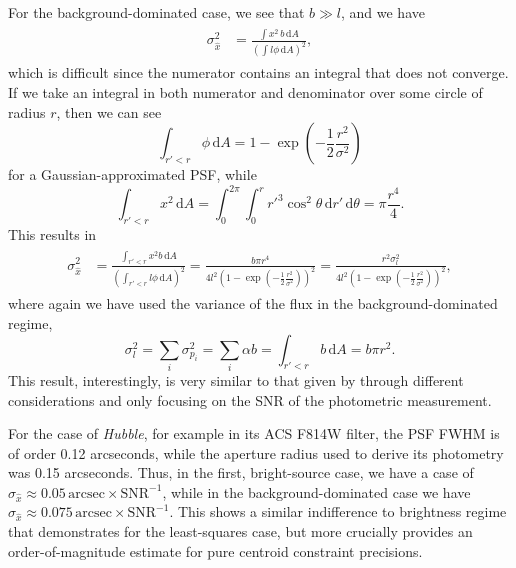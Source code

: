 \documentclass[SE,lsstdraft,authoryear,toc]{lsstdoc}
\begin{document}
For the background-dominated case, we see that $b \gg l$, and we have
\begin{align}
\begin{split}
  \sigma_{\hat{x}}^2 &= \frac{\int\!x^2\,b\,\mathrm{d}A}{\left(\int\!l\phi\,\mathrm{d}A\right)^2},
\end{split}
\end{align}
which is difficult since the numerator contains an integral that does not converge.
If we take an integral in both numerator and denominator over some circle of radius $r$, then we can see
\begin{equation}
  \int_{r{'} < r}\!\phi\,\mathrm{d}A = 1 - \exp\left(-\frac{1}{2} \frac{r^2}{\sigma^2}\right)
\end{equation}
for a Gaussian-approximated PSF, while
\begin{equation}
  \int_{r{'} < r}\! x^2\,\mathrm{d}A = \int_0^{2\pi}\!\int_0^{r} r{'}^3 \cos^2{\theta}\,\mathrm{d}r{'}\,\mathrm{d}\theta = \pi \frac{r^4}{4}.
\end{equation}
This results in
\begin{align}
\begin{split}
  \sigma_{\hat{x}}^2 &= \frac{\int_{r{'} < r}\! x^2b\,\mathrm{d}A}{\left(\int_{r{'} < r}\!l\phi\,\mathrm{d}A\right)^2} = \frac{b \pi r^4}{4 l^2 \left(1 - \exp\left(-\frac{1}{2} \frac{r^2}{\sigma^2}\right)\right)^2} = \frac{r^2 \sigma_l^2}{4l^2\left(1 - \exp\left(-\frac{1}{2} \frac{r^2}{\sigma^2}\right)\right)^2},
\end{split}
\end{align}
where again we have used the variance of the flux in the background-dominated regime,
\begin{equation}
  \sigma_l^2 = \sum_i \sigma_{p_i}^2 = \sum_i \alpha b= \int_{r{'} < r}\! b\,\mathrm{d}A = b \pi r^2.
\end{equation}
This result, interestingly, is very similar to that given by \citet{Naylor:1998aa} through different considerations and only focusing on the SNR of the photometric measurement.

For the case of \textit{Hubble}, for example in its ACS F814W filter, the PSF FWHM is of order 0.12 arcseconds, while the aperture radius used to derive its photometry was 0.15 arcseconds.
Thus, in the first, bright-source case, we have a case of $\sigma_{\hat{x}} \approx 0.05\,\mathrm{arcsec} \times \mathrm{SNR}^{-1}$, while in the background-dominated case we have $\sigma_{\hat{x}} \approx 0.075\,\mathrm{arcsec} \times \mathrm{SNR}^{-1}$.
This shows a similar indifference to brightness regime that \citet{King:1983aa} demonstrates for the least-squares case, but more crucially provides an order-of-magnitude estimate for pure centroid constraint precisions.
\end{document}
